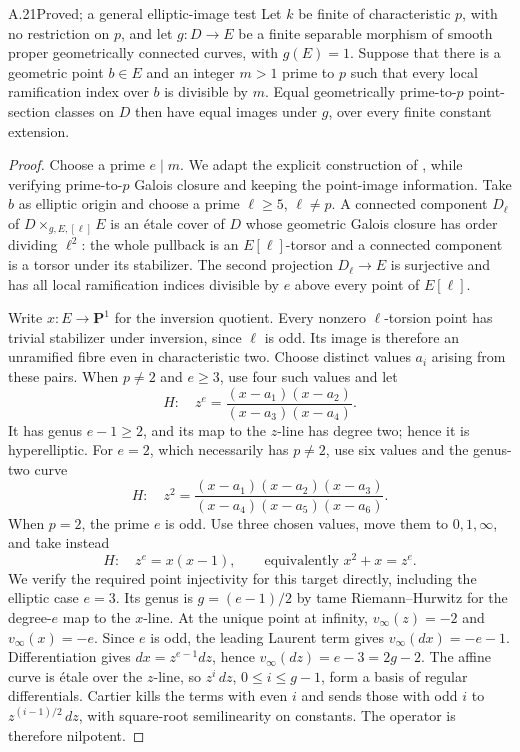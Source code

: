 \begin{claim}{A.21}{Proved; a general elliptic-image test}
Let $k$ be finite of characteristic $p$, with no restriction
on $p$, and let
$g:D\to E$ be a finite separable morphism of smooth proper
geometrically connected curves, with $g(E)=1$. Suppose that
there is a geometric point $b\in E$ and an integer $m>1$
prime to $p$ such that every local ramification index over
$b$ is divisible by $m$. Equal geometrically prime-to-$p$
point-section classes on $D$ then have equal images under
$g$, over every finite constant extension.
\end{claim}
\begin{proof}
Choose a prime $e\mid m$. We adapt the explicit construction
of \citet[\S3.1]{A_Poonen2005}, while verifying prime-to-$p$
Galois closure and keeping the point-image information.
Take $b$ as elliptic origin and choose a prime
$\ell\ge5$, $\ell\ne p$. A connected component $D_\ell$ of
$D\times_{g,E,[\ell]}E$ is an \'etale cover of $D$ whose
geometric Galois closure has order dividing $\ell^2$: the
whole pullback is an $E[\ell]$-torsor and a connected
component is a torsor under its stabilizer. The second
projection $D_\ell\to E$ is surjective and has all local
ramification indices divisible by $e$ above every point of
$E[\ell]$.

Write $x:E\to\mathbf P^1$ for the inversion quotient.
Every nonzero $\ell$-torsion point has trivial stabilizer
under inversion, since $\ell$ is odd. Its image is
therefore an unramified fibre even in characteristic two.
Choose distinct values $a_i$ arising from these pairs.
When $p\ne2$ and $e\ge3$, use four such values and
let
\[
 H:\quad z^e=\frac{(x-a_1)(x-a_2)}{(x-a_3)(x-a_4)}.
\]
It has genus $e-1\ge2$, and its map to the $z$-line has
degree two; hence it is hyperelliptic. For $e=2$, which
necessarily has $p\ne2$, use six
values and the genus-two curve
\[
 H:\quad z^2=
 \frac{(x-a_1)(x-a_2)(x-a_3)}{(x-a_4)(x-a_5)(x-a_6)}.
\]
When $p=2$, the prime $e$ is odd. Use three chosen values,
move them to $0,1,\infty$, and take instead
\[
 H:\quad z^e=x(x-1),\qquad\text{equivalently }x^2+x=z^e.
\]
We verify the required point injectivity for this target
directly, including the elliptic case $e=3$. Its genus is
$g=(e-1)/2$ by tame Riemann--Hurwitz for the degree-$e$
map to the $x$-line. At the unique point at infinity,
$v_\infty(z)=-2$ and $v_\infty(x)=-e$. Since $e$ is odd,
the leading Laurent term gives $v_\infty(dx)=-e-1$.
Differentiation gives $dx=z^{e-1}dz$, hence
$v_\infty(dz)=e-3=2g-2$. The affine curve is \'etale over
the $z$-line, so $z^i\,dz$, $0\le i\le g-1$, form a basis
of regular differentials. Cartier kills the terms with
even $i$ and sends those with odd $i$ to
$z^{(i-1)/2}\,dz$, with square-root semilinearity on
constants. The operator is therefore nilpotent.


\end{proof}
